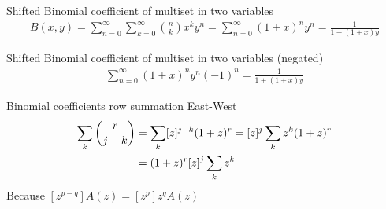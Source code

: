 \begin{identity}
    Shifted Binomial coefficient of multiset in two variables~\cite[eq. 15]{faris2011generating}
    \begin{align*}
        B(x, y) = \sum_{n=0}^{\infty} \sum_{k=0}^{\infty} \binom{n}{k} x^k y^n
        = \sum_{n=0}^{\infty} (1 + x)^n y^n = \frac{1}{1 - (1 + x)y}
    \end{align*}
\end{identity}
\begin{identity}
    Shifted Binomial coefficient of multiset in two variables (negated)
    \begin{align*}
        \sum_{n=0}^{\infty} (1 + x)^n y^n (-1)^n = \frac{1}{1 + (1 + x)y}
    \end{align*}
\end{identity}
\begin{identity}
    Binomial coefficients row summation East-West
    \begin{align*}
        \sum_{k} \binom{r}{j-k}
        &= \sum_{k} [z]^{j-k}(1+z)^r
        = [z]^{j} \sum_{k} z^k (1+z)^r \\
        &= (1+z)^r [z]^{j} \sum_{k} z^k
    \end{align*}
    Because $[z^{p-q}] A(z)=[z^p] z^{q} A(z)$
\end{identity}




\clearpage

